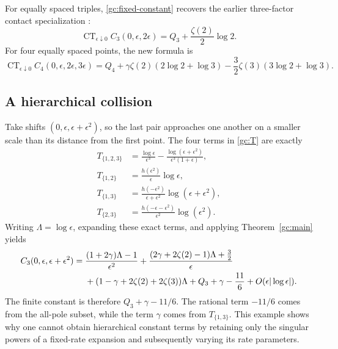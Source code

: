 \documentclass[11pt]{article}
\numberwithin{equation}{section}
\theoremstyle{definition}
\theoremstyle{remark}
\begin{document}
For equally spaced triples, \eqref{gc:fixed-constant} recovers the earlier
three-factor contact specialization \cite{RepoMixed}:
\[
 \operatorname{CT}_{\epsilon\downarrow0}
 C_3(0,\epsilon,2\epsilon)=Q_3+\frac{\zeta(2)}2\log2.
\]
For four equally spaced points, the new formula is
\begin{equation}\label{gc:quartic-example}
 \operatorname{CT}_{\epsilon\downarrow0}
 C_4(0,\epsilon,2\epsilon,3\epsilon)
 =Q_4+\gamma\zeta(2)(2\log2+\log3)
       -\frac32\zeta(3)(3\log2+\log3).
\end{equation}

\subsection{A hierarchical collision}
Take shifts $(0,\epsilon,\epsilon+\epsilon^2)$, so the last pair approaches
one another on a smaller scale than its distance from the first point.
The four terms in \eqref{gc:T} are exactly
\begin{align*}
 T_{\{1,2,3\}}&=\frac{\log\epsilon}{\epsilon^3}
 -\frac{\log(\epsilon+\epsilon^2)}{\epsilon^3(1+\epsilon)},\\
 T_{\{1,2\}}&=\frac{h(\epsilon^2)}\epsilon\log\epsilon,\\
 T_{\{1,3\}}&=\frac{h(-\epsilon^2)}{\epsilon+\epsilon^2}
                         \log(\epsilon+\epsilon^2),\\
 T_{\{2,3\}}&=\frac{h(-\epsilon-\epsilon^2)}{\epsilon^2}
                         \log(\epsilon^2).
\end{align*}
Writing $\Lambda=\log\epsilon$, expanding these exact terms, and applying
Theorem~\ref{gc:main} yields
\begin{align}\label{gc:hierarchy}
 C_3(0,\epsilon,\epsilon+\epsilon^2)
 ={}&\frac{(1+2\gamma)\Lambda-1}{\epsilon^2}
 +\frac{(2\gamma+2\zeta(2)-1)\Lambda+\tfrac32}{\epsilon}\notag\\
 &+(1-\gamma+2\zeta(2)+2\zeta(3))\Lambda
 +Q_3+\gamma-\frac{11}{6}
 +O(\epsilon|\log\epsilon|).
\end{align}
The finite constant is therefore $Q_3+\gamma-11/6$.  The rational term
$-11/6$ comes from the all-pole subset, while the term $\gamma$ comes from
$T_{\{1,3\}}$.  This example shows why one cannot obtain hierarchical
constant terms by retaining only the singular powers of a fixed-rate
expansion and subsequently varying its rate parameters.
\end{document}
